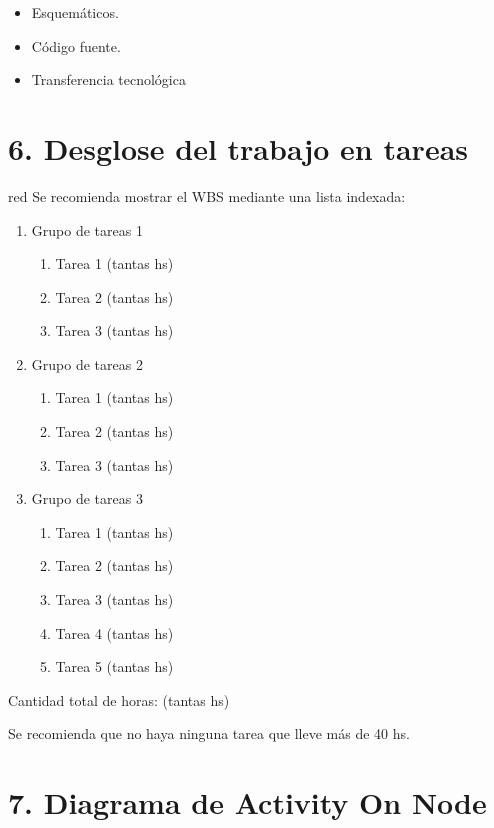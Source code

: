 \documentclass[11pt]{charter}
\begin{document}
\begin{itemize}
\item Esquemáticos.
\item Código fuente.
\item Transferencia tecnológica

\end{itemize}



\section{6. Desglose del trabajo en tareas}
\label{sec:wbs}

\begin{consigna}{red}
Se recomienda mostrar el WBS mediante una lista indexada:

\begin{enumerate}
\item Grupo de tareas 1
	\begin{enumerate}
	\item Tarea 1 (tantas hs)
	\item Tarea 2 (tantas hs)
	\item Tarea 3 (tantas hs)
	\end{enumerate}
\item Grupo de tareas 2
	\begin{enumerate}
	\item Tarea 1 (tantas hs)
	\item Tarea 2 (tantas hs)
	\item Tarea 3 (tantas hs)
	\end{enumerate}
	\item Grupo de tareas 3
	\begin{enumerate}
	\item Tarea 1 (tantas hs)
	\item Tarea 2 (tantas hs)
	\item Tarea 3 (tantas hs)
	\item Tarea 4 (tantas hs)
	\item Tarea 5 (tantas hs)
	\end{enumerate}
\end{enumerate}

Cantidad total de horas: (tantas hs)

Se recomienda que no haya ninguna tarea que lleve más de 40 hs. 

\end{consigna}

\section{7. Diagrama de Activity On Node}
\label{sec:AoN}
\end{document}
